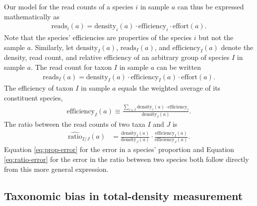 \documentclass[
]{article}
\begin{document}
Our model for the read counts of a species \(i\) in sample \(a\) can thus be expressed mathematically as
\begin{align}
  \text{reads}_{i}(a)
  = \text{density}_{i}(a) \cdot \text{efficiency}_{i} \cdot \text{effort}(a).
\end{align}
Note that the species' efficiencies are properties of the species \(i\) but not the sample \(a\).
Similarly, let \(\text{density}_{I}(a)\), \(\text{reads}_{I}(a)\), and \(\text{efficiency}_{I}(a)\) denote the density, read count, and relative efficiency of an arbitrary group of species \(I\) in sample \(a\).
The read count for taxon \(I\) in sample \(a\) can be written
\begin{align}
  \label{eq:measurement-model-general}
  \text{reads}_{I}(a)
  = \text{density}_{I}(a) \cdot \text{efficiency}_{I}(a) \cdot \text{effort}(a).
\end{align}
The efficiency of taxon \(I\) in sample \(a\) equals the weighted average of its constituent species,
\begin{align}
  \label{eq:efficiency-general}
  \text{efficiency}_I(a) 
  \equiv \frac{\sum_{i\in I}\text{density}_i(a)\cdot \text{efficiency}_i}{\text{density}_I(a)}.
\end{align}
The ratio between the read counts of two taxa \(I\) and \(J\) is
\begin{align}
  \label{eq:ratio-error-general}
  \widehat{\text{ratio}}_{I/J}(a)
  &= \frac{\text{density}_{I}(a)}{\text{density}_{J}(a)} \cdot \frac{\text{efficiency}_{I}(a)}{\text{efficiency}_{J}(a)}.
\end{align}
Equation \eqref{eq:prop-error} for the error in a species' proportion and Equation \eqref{eq:ratio-error} for the error in the ratio between two species both follow directly from this more general expression.

\hypertarget{total-density-bias}{%
\subsection{Taxonomic bias in total-density measurement}\label{total-density-bias}}
\end{document}
